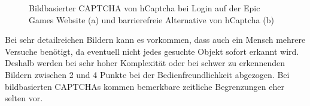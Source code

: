 \begin{figure}[h!]
    \centering
 \caption{Bildbasierter CAPTCHA von hCaptcha bei Login auf der Epic Games Website (a) und barrierefreie Alternative von hCaptcha (b)}
      \label{fig:fortnite}
\end{figure}

Bei sehr detailreichen Bildern kann es vorkommen, dass auch ein Mensch mehrere Versuche benötigt, da eventuell nicht jedes gesuchte Objekt sofort erkannt wird.
Deshalb werden bei sehr hoher Komplexität oder bei schwer zu erkennenden Bildern zwischen 2 und 4 Punkte bei der Bedienfreundlichkeit abgezogen.
Bei bildbasierten CAPTCHAs kommen bemerkbare zeitliche Begrenzungen eher selten vor. 

